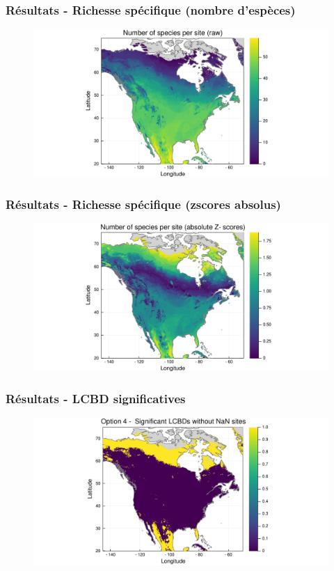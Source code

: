 \documentclass[10pt]{beamer}
\begin{document}
\begin{frame}
  \frametitle{Résultats - Richesse spécifique (nombre d'espèces)}
  \begin{figure}
    \centering
    \includegraphics[scale=0.4]{fig/richness-ebd.pdf}
  \end{figure}
\end{frame}

\begin{frame}
  \frametitle{Résultats - Richesse spécifique (zscores absolus)}
  \begin{figure}
    \centering
    \includegraphics[scale=0.4]{fig/richness-ebd-zscores.pdf}
  \end{figure}
\end{frame}

\begin{frame}
  \frametitle{Résultats - LCBD significatives}
  \begin{figure}
    \centering
    \includegraphics[scale=0.4]{fig/lcbd-ebd-significant.pdf}
  \end{figure}
\end{frame}
\end{document}
